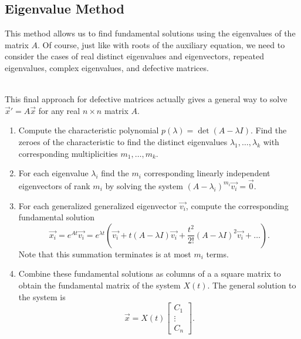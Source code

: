 \subsection{Eigenvalue Method}
\noindent
This method allows us to find fundamental solutions using the eigenvalues of the matrix $A$.
Of course, just like with roots of the auxiliary equation, we need to consider the cases of real distinct eigenvalues and eigenvectors, repeated eigenvalues, complex eigenvalues, and defective matrices. 




 \\


\noindent
This final approach for defective matrices actually gives a general way to solve $\vec{x}' = A\vec{x}$ for any real $n \times n$ matrix $A$.
\begin{enumerate}[label = \arabic*)]
	\item
		Compute the characteristic polynomial $p(\lambda) = \det{(A - \lambda I)}$.
		Find the zeroes of the characteristic to find the distinct eigenvalues $\lambda_1, \ldots, \lambda_k$ with corresponding multiplicities $m_1, \ldots, m_k$.
	\item
		For each eigenvalue $\lambda_i$ find the $m_i$ corresponding linearly independent eigenvectors of rank $m_i$ by solving the system $(A - \lambda_i)^{m_i}\vec{v_i} = \vec{0}$.
	\item
		For each generalized generalized eigenvector $\vec{v_i}$, compute the corresponding fundamental solution
		\begin{equation*}
			\vec{x_i} = e^{At}\vec{v_i} = e^{\lambda t}\left(\vec{v_i} + t(A - \lambda I)\vec{v_i} + \frac{t^2}{2!}(A - \lambda I)^2\vec{v_i} + \ldots\right).
		\end{equation*}
		Note that this summation terminates is at most $m_i$ terms.
	\item
		Combine these fundamental solutions as columns of a a square matrix to obtain the fundamental matrix of the system $X(t)$.
		The general solution to the system is
		\begin{equation*}
			\vec{x} = X(t)\begin{bmatrix}
				C_1 \\
				\vdots \\
				C_n
			\end{bmatrix}.
		\end{equation*}
\end{enumerate}